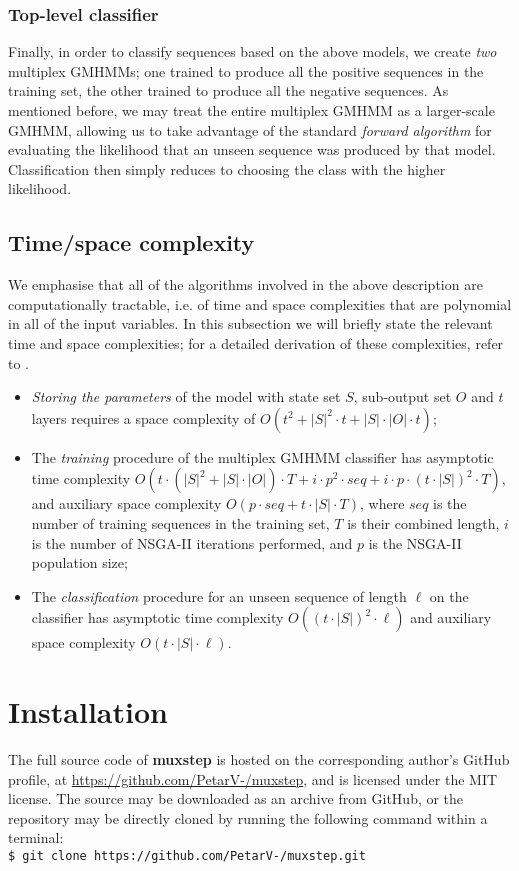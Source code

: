 \documentclass[12pt,openany]{article}
\newcommand{\shellcmd}[1]{\\\indent\indent\texttt{\footnotesize\$ #1}}
\begin{document}
	\subsubsection{Top-level classifier}
	
	Finally, in order to classify sequences based on the above models, we create \emph{two} multiplex GMHMMs; one trained to produce all the positive sequences in the training set, the other trained to produce all the negative sequences. As mentioned before, we may treat the entire multiplex GMHMM as a larger-scale GMHMM, allowing us to take advantage of the standard \emph{forward algorithm} for evaluating the likelihood that an unseen sequence was produced by that model. Classification then simply reduces to choosing the class with the higher likelihood.
	
	\subsection{Time/space complexity}
	
	We emphasise that all of the algorithms involved in the above description are computationally tractable, i.e. of time and space complexities that are polynomial in all of the input variables. In this subsection we will briefly state the relevant time and space complexities; for a detailed derivation of these complexities, refer to \cite{Velickovic15}.
	\begin{itemize}
		\item \emph{Storing the parameters} of the model with state set $S$, sub-output set $O$ and $t$ layers requires a space complexity of $O(t^2 + |S|^2\cdot t + |S|\cdot |O|\cdot t)$;
		\item The \emph{training} procedure of the multiplex GMHMM classifier has asymptotic time complexity $O(t\cdot(|S|^2 + |S|\cdot |O|)\cdot T + i\cdot p^2\cdot seq + i\cdot p\cdot(t\cdot |S|)^2\cdot T)$, and auxiliary space complexity $O(p\cdot seq + t\cdot |S|\cdot T)$, where $seq$ is the number of training sequences in the training set, $T$ is their combined length, $i$ is the number of NSGA-II iterations performed, and $p$ is the NSGA-II population size;
		\item The \emph{classification} procedure for an unseen sequence of length $\ell$ on the classifier has asymptotic time complexity $O((t\cdot |S|)^2\cdot \ell)$ and auxiliary space complexity $O(t \cdot |S|\cdot \ell)$.
	\end{itemize}
	
	\section{Installation}\label{sec:install}
	The full source code of {\bf muxstep} is hosted on the corresponding author's GitHub profile, at \url{https://github.com/PetarV-/muxstep}, and is licensed under the MIT license. The source may be downloaded as an archive from GitHub, or the repository may be directly cloned by running the following command within a terminal:
	\shellcmd{git clone https://github.com/PetarV-/muxstep.git}
\end{document}
